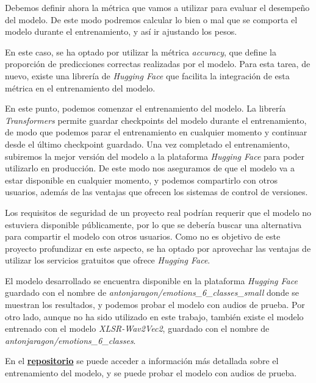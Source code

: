 Debemos definir ahora la métrica que vamos a utilizar para evaluar el desempeño del modelo.
De este modo podremos calcular lo bien o mal que se comporta el modelo durante el entrenamiento, y así ir ajustando los pesos.

En este caso, se ha optado por utilizar la métrica \textit{accuracy}, que define la proporción de predicciones correctas realizadas por el modelo.
Para esta tarea, de nuevo, existe una librería de \textit{Hugging Face} que facilita la integración de esta métrica en el entrenamiento del modelo.

En este punto, podemos comenzar el entrenamiento del modelo.
La librería \textit{Transformers} permite guardar checkpoints del modelo durante el entrenamiento, de modo que podemos parar el entrenamiento en cualquier momento y continuar desde el último checkpoint guardado.
Una vez completado el entrenamiento, subiremos la mejor versión del modelo a la plataforma \textit{Hugging Face} para poder utilizarlo en producción.
De este modo nos aseguramos de que el modelo va a estar disponible en cualquier momento, y podemos compartirlo con otros usuarios, además de las ventajas que ofrecen los sistemas de control de versiones.

Los requisitos de seguridad de un proyecto real podrían requerir que el modelo no estuviera disponible públicamente, por lo que se debería buscar una alternativa para compartir el modelo con otros usuarios.
Como no es objetivo de este proyecto profundizar en este aspecto, se ha optado por aprovechar las ventajas de utilizar los servicios gratuitos que ofrece \textit{Hugging Face}.

El modelo desarrollado se encuentra disponible en la plataforma \textit{Hugging Face} guardado con el nombre de \textit{antonjaragon/emotions\_6\_classes\_small} donde se muestran los resultados, y podemos probar el modelo con audios de prueba.
Por otro lado, aunque no ha sido utilizado en este trabajo, también existe el modelo entrenado con el modelo \textit{XLSR-Wav2Vec2}, guardado con el nombre de \textit{antonjaragon/emotions\_6\_classes}.

En el \textbf{\href{https://huggingface.co/antonjaragon/emotions_6_classes_small}{repositorio}} se puede acceder a información más detallada sobre el entrenamiento del modelo, y se puede probar el modelo con audios de prueba.



